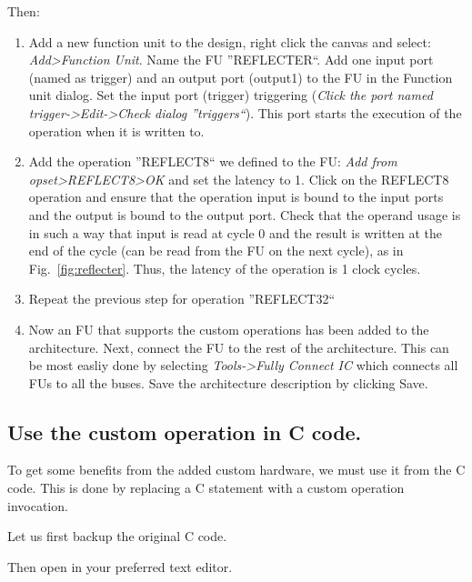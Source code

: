 \documentclass[twoside]{tceusermanual}
\begin{document}
Then:
\begin{enumerate}
\item%
  Add a new function unit to the design, right click the canvas and
  select: \textit{Add>Function Unit}. Name the FU ''REFLECTER``. Add
  one input port (named as trigger) and an output port (output1) to
  the FU in the Function unit dialog. Set the input port (trigger)
  triggering (\textit{Click the port named trigger->Edit->Check dialog
    ''triggers``}). This port starts the execution of the operation
  when it is written to.
\item%
  Add the operation ''REFLECT8`` we defined to the FU: \textit{Add
    from opset>REFLECT8>OK} and set the latency to 1. Click on the
  REFLECT8 operation and ensure that the operation input is bound to
  the input ports and the output is bound to the output port. Check
  that the operand usage is in such a way that input is read at cycle
  0 and the result is written at the end of the cycle (can be read
  from the FU on the next cycle), as in
  Fig.~\ref{fig:reflecter}. Thus, the latency of the operation is 1
  clock cycles.
\item%
  Repeat the previous step for operation ''REFLECT32``
\item%
  Now an FU that supports the custom operations has been added to the
  architecture. Next, connect the FU to the rest of the
  architecture. This can be most easliy done by selecting
  \textit{Tools->Fully Connect IC} which connects all FUs to all the
  buses. Save the architecture description by clicking Save.
\end{enumerate}


\subsection{Use the custom operation in C code.}

To get some benefits from the added custom hardware, we must use it
from the C code. This is done by replacing a C statement with a custom
operation invocation.

Let us first backup the original C code.


Then open  in your preferred text editor.
\end{document}
